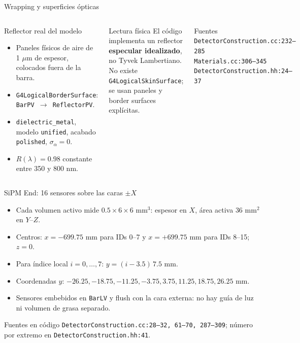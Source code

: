 \documentclass[aspectratio=169]{beamer}
\begin{document}
\begin{frame}{Wrapping y superficies ópticas}
  \small
  \begin{columns}[T]
    \begin{block}{Reflector real del modelo}
      \begin{itemize}
        \item Paneles físicos de aire de 1 $\mu$m de espesor, colocados fuera
          de la barra.
        \item \texttt{G4LogicalBorderSurface}: \texttt{BarPV $\to$ ReflectorPV}.
        \item \texttt{dielectric\_metal}, modelo \texttt{unified},
          acabado \texttt{polished}, $\sigma_\alpha=0$.
        \item $R(\lambda)=0.98$ constante entre 350 y 800 nm.
      \end{itemize}
    \end{block}
    \begin{alertblock}{Lectura física}
      El código implementa un reflector \textbf{especular idealizado}, no
      Tyvek Lambertiano. No existe \texttt{G4LogicalSkinSurface}; se usan
      paneles y border surfaces explícitas.
    \end{alertblock}
    \begin{block}{Fuentes}
      \scriptsize
      \texttt{DetectorConstruction.cc:232--285}\\
      \texttt{Materials.cc:306--345}\\
      \texttt{DetectorConstruction.hh:24--37}
    \end{block}
  \end{columns}
\end{frame}

\begin{frame}{SiPM End: 16 sensores sobre las caras $\pm X$}
  \small
  \begin{itemize}
    \item Cada volumen activo mide $0.5\times6\times6$ mm$^3$:
      espesor en $X$, área activa $36$ mm$^2$ en $Y$--$Z$.
    \item Centros: $x=-699.75$ mm para IDs 0--7 y $x=+699.75$ mm para
      IDs 8--15; $z=0$.
    \item Para índice local $i=0,\ldots,7$:
      $y=(i-3.5)\,7.5$ mm.
    \item Coordenadas $y$: $-26.25,-18.75,-11.25,-3.75,
      3.75,11.25,18.75,26.25$ mm.
    \item Sensores embebidos en \texttt{BarLV} y flush con la cara externa:
      no hay guía de luz ni volumen de grasa separado.
  \end{itemize}
  \begin{alertblock}{Fuentes en código}
    \scriptsize
    \texttt{DetectorConstruction.cc:28--32, 61--70, 287--309};
    número por extremo en \texttt{DetectorConstruction.hh:41}.
  \end{alertblock}
\end{frame}
\end{document}
